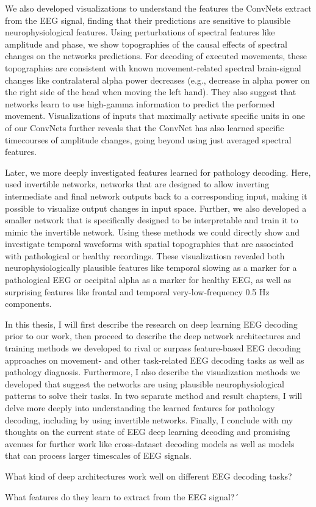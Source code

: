 We also developed visualizations to understand the features the ConvNets
extract from the EEG signal, finding that their predictions are
sensitive to plausible neurophysiological features. Using perturbations
of spectral features like amplitude and phase, we show topographies of
the causal effects of spectral changes on the networks predictions. For
decoding of executed movements, these topographies are consistent with
known movement-related spectral brain-signal changes like contralateral
alpha power decreases (e.g., decrease in alpha power on the right side
of the head when moving the left hand). They also suggest that networks
learn to use high-gamma information to predict the performed movement.
Visualizations of inputs that maximally activate specific units in one
of our ConvNets further reveals that the ConvNet has also learned
specific timecourses of amplitude changes, going beyond using just
averaged spectral features.

Later, we more deeply investigated features learned for pathology
decoding. Here, used invertible networks, networks that are
designed to allow inverting intermediate and final network outputs
back to a corresponding input, making it possible to visualize output changes in input space. Further, we also developed a smaller network that is
specifically designed to be interpretable and train it to mimic the
invertible network. Using these methods we could directly show and
investigate temporal waveforms with spatial topographies that are
associated with pathological or healthy recordings. These visualizatiosn
revealed both neurophysiologically plausible features like temporal
slowing as a marker for a pathological EEG or occipital alpha as a
marker for healthy EEG, as well as surprising features like frontal and
temporal very-low-frequency 0.5 Hz components.

    In this thesis, I will first describe the research on deep learning EEG
decoding prior to our work, then proceed to describe the deep network
architectures and training methods we developed to rival or surpass
feature-based EEG decoding approaches on movement- and other
task-related EEG decoding tasks as well as pathology diagnosis.
Furthermore, I also describe the visualization methods we developed that
suggest the networks are using plausible neurophysiological patterns to
solve their tasks. In two separate method and result chapters, I will
delve more deeply into understanding the learned features for pathology
decoding, including by using invertible networks. Finally, I conclude
with my thoughts on the current state of EEG deep learning decoding and
promising avenues for further work like cross-dataset decoding models as
well as models that can process larger timescales of EEG signals.

\begin{openbox}
\item What kind of deep architectures work well on different EEG decoding tasks?
\item What features do they learn to extract from the EEG signal?´
\end{openbox}
